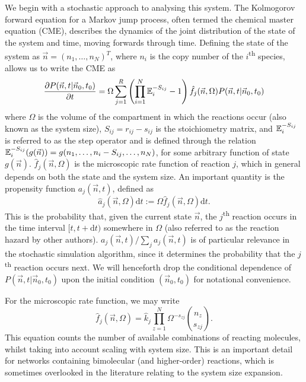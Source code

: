 \documentclass[10pt,letterpaper]{article}
\begin{document}
We begin with a stochastic approach to analysing this system. The Kolmogorov forward equation for a Markov jump process, often termed the chemical master equation (CME), describes the dynamics of the joint distribution of the state of the system and time, moving forwards through time. Defining the state of the system as $\vec{n}=(n_1,\dots,n_N)^T$, where $n_i$ is the copy number of the $i$\textsuperscript{th} species, allows us to write the CME as
\begin{equation}
\frac{\partial P(\vec{n},t|\vec{n}_0,t_0)}{\partial t} = \Omega \sum_{j=1}^R \left( \prod_{i=1}^N \mathbb{E}_i^{-S_{ij}} -1\right)\hat{f}_j(\vec{n},\Omega)P(\vec{n},t|\vec{n}_0,t_0) \label{Eq:CME}
\end{equation}
where $\Omega$ is the volume of the compartment in which the reactions occur (also known as the system size), $S_{ij} = r_{ij}-s_{ij}$ is the stoichiometry matrix, and $\mathbb{E}_i^{-S_{ij}}$ is referred to as the step operator and is defined through the relation $\mathbb{E}_i^{-S_{ij}}(g(\vec{n})) = g(n_1,\dots,n_i-S_{ij},\dots,n_N)$, for some arbitrary function of state $g(\vec{n})$. $\hat{f}_j(\vec{n}, \Omega)$ is the microscopic rate function of reaction $j$, which in general depends on both the state and the system size. An important quantity is the propensity function $a_j(\vec{n},t)$, defined as
\begin{equation}
\hat{a}_j(\vec{n},\Omega)\text{d}t := \Omega\hat{f}_j(\vec{n},\Omega)\text{d}t.
\end{equation}
This is the probability that, given the current state $\vec{n}$, the $j$\textsuperscript{th} reaction occurs in the time interval $[t,t+\text{d}t)$ somewhere in $\Omega$ (also referred to as the reaction hazard by other authors\cite{Wilkinson11}). $a_j(\vec{n},t)/\sum_ja_j(\vec{n},t)$ is of particular relevance in the stochastic simulation algorithm\cite{Gillespie76}, since it determines the probability that the $j$\textsuperscript{th} reaction occurs next. We will henceforth drop the conditional dependence of $P(\vec{n},t|\vec{n}_0,t_0)$ upon the initial condition $(\vec{n}_0,t_0)$ for notational convenience.

For the microscopic rate function, we may write
\begin{equation}
\hat{f}_j(\vec{n},\Omega) = \hat{k}_j \prod_{z=1}^N \Omega^{-s_{zj}} \binom{n_z}{s_{zj}}.  \label{eq:micro_rate_fn}
\end{equation}
This equation counts the number of available combinations of reacting molecules\cite{Gillespie76,Wilkinson11}, whilst taking into account scaling with system size\cite{Grima10,Aryaman19b}. This is an important detail for networks containing bimolecular (and higher-order) reactions, which is sometimes overlooked in the literature relating to the system size expansion.
\end{document}
